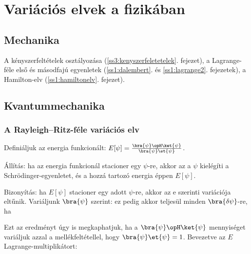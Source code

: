 \chapter{Vari\'aci\'os elvek a fizik\'aban}
 
 \section{Mechanika}
  
  A kényszerfeltételek osztályozása (\ref{ss3:kenyszerfeletetelek}. fejezet), a Lagrange-féle első és másodfajú egyenletek (\ref{ss1:dalembert}. és \ref{ss1:lagrange2}. fejezetek), a Hamilton-elv (\ref{ss1:hamiltonelv}. fejezet).
  
 \section{Kvantummechanika}
  
  \subsection{A Rayleigh--Ritz-féle variációs elv}
   
   Definiáljuk az energia funkcionált: $E[\psi]=\frac{\bra{\psi}\opH\ket{\psi}}{\bra{\psi}\et{\psi}}$. 
   
   Állítás: ha az energia funkcionál stacioner egy $\psi$-re, akkor az a $\psi$ kielégíti a Schrödinger-egyenletet, és a hozzá tartozó energia éppen $E[\psi]$. 
   
   Bizonyítás: ha $E[\psi]$ stacioner egy adott $\psi$-re, akkor az e szerinti variációja eltűnik.
   Variáljunk $\bra{\psi}$ szerint:
   ez pedig akkor teljesül minden $\bra{\delta\psi}$-re, ha 
   
   Ezt az eredményt úgy is megkaphatjuk, ha a $\bra{\psi}\opH\ket{\psi}$ mennyiséget variáljuk azzal a mellékfeltétellel, hogy $\bra{\psi}\et{\psi}=1$.
   Bevezetve az $E$ Lagrange-multiplikátort:
   
